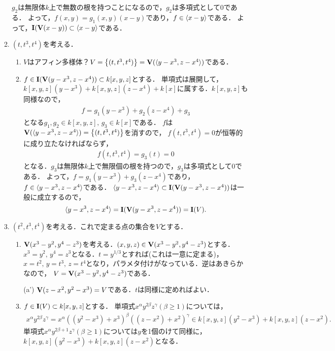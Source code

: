 \documentclass[9pt]{ltjsarticle}
\theoremstyle{break}
\theoremstyle{break}
\theoremstyle{break}
\theoremstyle{break}
\theoremstyle{break}
\theoremstyle{break}
\theoremstyle{break}
\theoremstyle{break}
\theoremstyle{break}
\theoremstyle{break}
\theoremstyle{break}
\theoremstyle{break}
\theoremstyle{break}
\theoremstyle{break}
\theoremstyle{break}
\theoremstyle{nonumberbreak}
\theoremstyle{nonumberbreak}
\begin{document}
\begin{enumerate}[label=(問題\arabic*)]
$g_2$は無限体$k$上で無数の根を持つことになるので，$g_2$は多項式として0である．
よって，$f(x,y)=g_1(x,y)(x-y)$であり，$f\in \langle x-y \rangle$である．
よって，$\textbf I(\textbf V(x-y))\subset \langle x-y \rangle$である．
 \item $(t,t^3,t^4)$を考える．
\begin{enumerate}[label=(\alph*)]
 \item $V$はアフィン多様体？$V=\left\{(t,t^3,t^4)\right\}  = \textbf V(\langle y-x^3,z-x^4 \rangle)$である．
 \item $f\in \textbf I(\textbf V(y-x^3,z-x^4))\subset k[x,y,z]$とする．
単項式は展開して，$k[x,y,z](y-x^3) + k[x,y,z](z-x^4) + k[x]$に属する．$k[x,y,z]$も同様なので，
\begin{align}
 f = g_1(y-x^3) + g_2(z-x^4) + g_3
\end{align}
となる$g_1,g_2 \in k[x,y,z],\, g_3 \in k[x]$である．
$f$は$\textbf V(\langle y-x^3,z-x^4 \rangle)=\left\{(t,t^3,t^4)\right\}$を消すので，
$f(t,t^3,t^4)=0$が恒等的に成り立たなければならず，
\begin{align}
 f(t,t^3,t^4) = g_3(t) = 0
\end{align}
となる．$g_3$は無限体$k$上で無限個の根を持つので，$g_3$は多項式として0である．
よって，$f = g_1(y-x^3)+ g_3(z-x^4)$であり，$f\in \langle y-x^3,z-x^4 \rangle$である．
$\langle y-x^3,z-x^4 \rangle\subset \textbf I(\textbf V(y-x^3,z-x^4))$は一般に成立するので，
\begin{align}
 \langle y-x^3,z-x^4 \rangle = \textbf I(\textbf V(y-x^3,z-x^4)) = \textbf I(V).
\end{align}
\end{enumerate}
 \item $(t^2,t^3,t^4)$を考える．これで定まる点の集合を$V$とする．
\begin{enumerate}[label=(\alph*)]
 \item $\textbf V(x^3-y^2,y^4-z^3)$を考える．$(x,y,z)\in \textbf V(x^3-y^2,y^4-z^3)$とする．$x^3=y^2,\, y^4=z^3$となる．$t=y^{1/3}$とすれば(これは一意に定まる)，$x=t^2,\,y=t^3,\, z=t^4$となり，パラメタ付けがなっている．逆はあきらかなので，
$V = \textbf V(x^3-y^2,y^4-z^3)$である．
 \item[(a')] $\textbf V(z-x^2,y^2-x^3)=V$である．$t$は同様に定めればよい．
 \item $f\in \textbf I(V) \subset k[x,y,z]$とする．
単項式$x^\alpha y^{2\beta} z^\gamma(\beta \ge 1)$については，
\begin{align}
 x^\alpha y^{2\beta}z^\gamma = x^\alpha ((y^2-x^3)+x^3)^\beta ((z-x^2)+x^2)^\gamma \in k[x,y,z](y^2-x^3) + k[x,y,z](z-x^2).
\end{align}
単項式$x^\alpha y^{2\beta + 1}z^\gamma (\beta \ge 1)$については$y$を1個のけて同様に，$k[x,y,z](y^2-x^3) + k[x,y,z](z-x^2)$となる．

\end{enumerate}
\end{enumerate}
\end{document}
